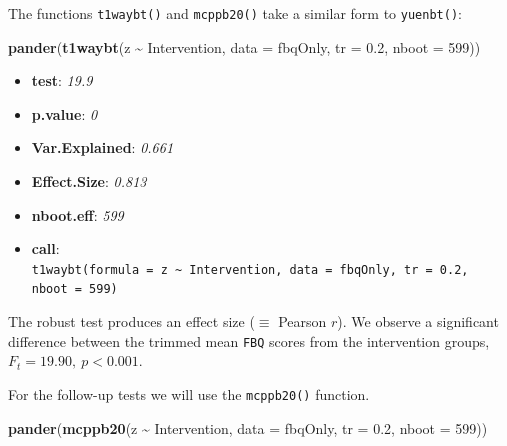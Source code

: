 \documentclass[
]{article}
\newenvironment{Shaded}{\begin{snugshade}}{\end{snugshade}}
\newcommand{\AttributeTok}[1]{\textcolor[rgb]{0.13,0.29,0.53}{#1}}
\newcommand{\DecValTok}[1]{\textcolor[rgb]{0.00,0.00,0.81}{#1}}
\newcommand{\FloatTok}[1]{\textcolor[rgb]{0.00,0.00,0.81}{#1}}
\newcommand{\FunctionTok}[1]{\textcolor[rgb]{0.13,0.29,0.53}{\textbf{#1}}}
\newcommand{\NormalTok}[1]{#1}
\newcommand{\SpecialCharTok}[1]{\textcolor[rgb]{0.81,0.36,0.00}{\textbf{#1}}}
\providecommand{\tightlist}{%
  \setlength{\itemsep}{0pt}\setlength{\parskip}{0pt}}
\begin{document}
The functions \texttt{t1waybt()} and \texttt{mcppb20()} take a similar form to \texttt{yuenbt()}:

\begin{Shaded}
\begin{Highlighting}[]
    \FunctionTok{pander}\NormalTok{(}\FunctionTok{t1waybt}\NormalTok{(z }\SpecialCharTok{\textasciitilde{}}\NormalTok{ Intervention, }\AttributeTok{data =}\NormalTok{ fbqOnly, }\AttributeTok{tr =} \FloatTok{0.2}\NormalTok{, }\AttributeTok{nboot =} \DecValTok{599}\NormalTok{))}
\end{Highlighting}
\end{Shaded}

\begin{itemize}
\tightlist
\item
  \textbf{test}: \emph{19.9}
\item
  \textbf{p.value}: \emph{0}
\item
  \textbf{Var.Explained}: \emph{0.661}
\item
  \textbf{Effect.Size}: \emph{0.813}
\item
  \textbf{nboot.eff}: \emph{599}
\item
  \textbf{call}: \texttt{t1waybt(formula\ =\ z\ \textasciitilde{}\ Intervention,\ data\ =\ fbqOnly,\ tr\ =\ 0.2,\ \ \ \ \ \ nboot\ =\ 599)}
\end{itemize}

The robust test produces an effect size (\(\equiv\) Pearson \(r\)). We observe a significant difference between the trimmed mean \texttt{FBQ} scores from the intervention groups, \(F_t = 19.90, \ p < 0.001\).

For the follow-up tests we will use the \texttt{mcppb20()} function.

\begin{Shaded}
\begin{Highlighting}[]
    \FunctionTok{pander}\NormalTok{(}\FunctionTok{mcppb20}\NormalTok{(z }\SpecialCharTok{\textasciitilde{}}\NormalTok{ Intervention,  }\AttributeTok{data =}\NormalTok{ fbqOnly, }\AttributeTok{tr =} \FloatTok{0.2}\NormalTok{, }\AttributeTok{nboot =} \DecValTok{599}\NormalTok{))}
\end{Highlighting}
\end{Shaded}
\end{document}

